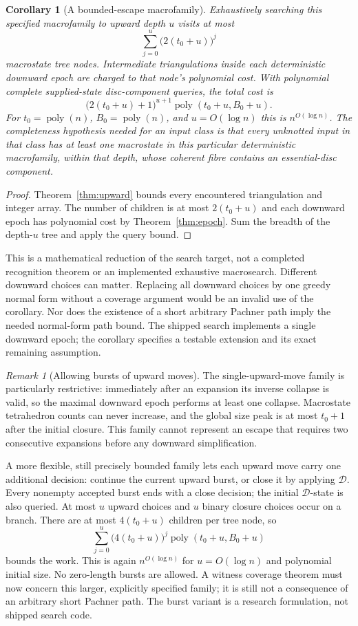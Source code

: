 \documentclass[11pt,letterpaper]{article}
\newtheorem{corollary}[theorem]{Corollary}
\theoremstyle{definition}
\theoremstyle{remark}
\newtheorem{remark}[theorem]{Remark}
\newcommand{\poly}{\operatorname{poly}}
\begin{document}
\begin{corollary}[A bounded-escape macrofamily]
\label{cor:macro}
Exhaustively searching this specified macrofamily to upward depth $u$
visits at most
\[
 \sum_{j=0}^{u}\bigl(2(t_0+u)\bigr)^j
\]
macrostate tree nodes. Intermediate triangulations inside each deterministic
downward epoch are charged to that node's polynomial cost. With polynomial
complete supplied-state disc-component queries, the total cost is
\[
 \bigl(2(t_0+u)+1\bigr)^{u+1}
 \poly(t_0+u,B_0+u).
\]
For $t_0=\poly(n)$, $B_0=\poly(n)$, and $u=O(\log n)$ this is
$n^{O(\log n)}$. The completeness hypothesis needed for an input class
is that every unknotted input in that class has at least one macrostate in
this \emph{particular deterministic macrofamily}, within that depth, whose
coherent fibre contains an essential-disc component.
\end{corollary}
\begin{proof}
Theorem~\ref{thm:upward} bounds every encountered triangulation and integer
array. The number of children is at most $2(t_0+u)$ and each downward epoch
has polynomial cost by Theorem~\ref{thm:epoch}. Sum the breadth of the
depth-$u$ tree and apply the query bound.
\end{proof}

This is a mathematical reduction of the search target, not a completed
recognition theorem or an implemented exhaustive macrosearch. Different
downward choices can matter. Replacing all downward choices by one greedy
normal form without a coverage argument would be an invalid use of the
corollary. Nor does the existence of a short arbitrary Pachner path imply
the needed normal-form path bound. The shipped search implements a single
downward epoch; the corollary specifies a testable extension and its exact
remaining assumption.

\begin{remark}[Allowing bursts of upward moves]
The single-upward-move family is particularly restrictive: immediately
after an expansion its inverse collapse is valid, so the maximal downward
epoch performs at least one collapse. Macrostate tetrahedron counts can
never increase, and the global size peak is at most $t_0+1$ after the
initial closure. This family cannot represent an escape that requires
two consecutive expansions before any downward simplification.

A more flexible, still precisely bounded family lets each upward move
carry one additional decision: continue the current upward burst, or close
it by applying $\mathcal D$. Every nonempty accepted burst ends with a
close decision; the initial $\mathcal D$-state is also queried. At most
$u$ upward choices and $u$ binary closure choices occur on a branch.
There are at most $4(t_0+u)$ children per tree node, so
\[
 \sum_{j=0}^{u}\bigl(4(t_0+u)\bigr)^j
 \poly(t_0+u,B_0+u)
\]
bounds the work. This is again $n^{O(\log n)}$ for $u=O(\log n)$ and
polynomial initial size. No zero-length bursts are allowed. A witness
coverage theorem must now concern this larger, explicitly specified
family; it is still not a consequence of an arbitrary short Pachner path.
The burst variant is a research formulation, not shipped search code.
\end{remark}
\end{document}
